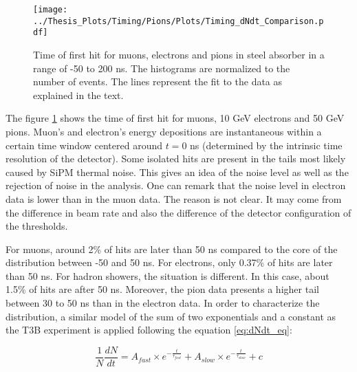 \begin{figure}[htbp!]
	\centering
	\texttt{[image: ../Thesis\_Plots/Timing/Pions/Plots/Timing\_dNdt\_Comparison.pdf]}
	\caption{Time of first hit for muons, electrons and pions in steel absorber in a range of -50 to 200 ns. The histograms are normalized to the number of events. The lines represent the fit to the data as explained in the text.}
	\label{fig:dNdt_Comparison}
\end{figure}

The figure \ref{fig:dNdt_Comparison} shows the time of first hit for muons, 10 GeV electrons and 50 GeV pions. Muon's and electron's energy depositions are instantaneous within a certain time window centered around $t=0$ ns (determined by the intrinsic time resolution of the detector). Some isolated hits are present in the tails most likely caused by SiPM thermal noise. This gives an idea of the noise level as well as the rejection of noise in the analysis. One can remark that the noise level in electron data is lower than in the muon data. The reason is not clear. It may come from the difference in beam rate and also the difference of the detector configuration of the thresholds.

For muons, around 2\% of hits are later than 50 ns compared to the core of the distribution between -50 and 50 ns. For electrons, only 0.37\% of hits are later than 50 ns. For hadron showers, the situation is different. In this case, about 1.5\% of hits are after 50 ns. Moreover, the pion data presents a higher tail between 30 to 50 ns than in the electron data. In order to characterize the distribution, a similar model of the sum of two exponentials and a constant as the T3B experiment \cite{Simon2013} is applied following the equation \ref{eq:dNdt_eq}:

\begin{equation} \label{eq:dNdt_eq}
	\frac{1}{N}\frac{dN}{dt} = A_{fast} \times e^{-\frac{t}{\tau_{fast}}} + A_{slow} \times e^{-\frac{t}{\tau_{slow}}} + c
\end{equation}

